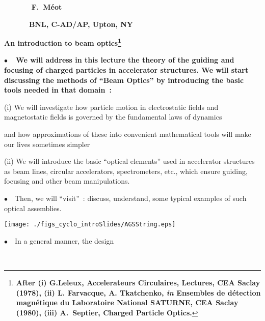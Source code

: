 \documentclass[12pt]{paper}
\newcommand{\nib}{\noindent $\bullet$~}
\newcommand{\blue}{\color{blue}}
\begin{document}
\landscape


\sffamily


  
{
 ~~~~~~~ \hfill \large   \bf F.~M\'eot 

~~~~~~~\hfill \large   \bf BNL, C-AD/AP, Upton, NY
}

\begin{center} 
\Huge  
\bf An introduction to beam optics\footnote{\large \bf After (i) G.Leleux, Accelerateurs Circulaires, Lectures, CEA Saclay (1978), 
(ii) L. Farvacque, A. Tkatchenko, \textsl{in} Ensembles de d\'etection magn\'etique du Laboratoire National SATURNE,  CEA Saclay (1980), (iii) A.~Septier, Charged Particle Optics.}
\end{center} 


{\blue   \Large \bf
\nib\ We will address in this lecture  the theory of the  guiding and focusing of charged particles in accelerator structures. 
We will start discussing the methods of ``Beam Optics'' by  introducing the basic tools  needed in that domain~: 



(i) We will investigate how particle motion in electrostatic fields and magnetostatic fields is governed by the fundamental 
laws of dynamics 



and how  approximations of these into convenient  mathematical  tools will make our lives sometimes simpler 



(ii) We will introduce the basic ``optical elements'' used in accelerator structures as beam lines, circular 
accelerators, spectrometers, etc.,  which ensure guiding, focusing and other beam manipulations. 



\nib\ Then, we will ``visit''~: discuss, understand, some typical examples of such optical assemblies. 
}


\begin{center}
\texttt{[image: ./figs\_cyclo\_introSlides/AGSString.eps]}
\end{center}



\clearpage

\tableofcontents




\clearpage

\nib\ In a general manner, the design  

~
\end{document}
